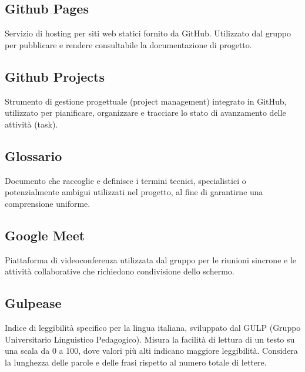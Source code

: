 \documentclass[a4paper, 11pt, oneside]{scrartcl} %
\begin{document}
\subsection*{Github Pages}


Servizio di hosting per siti web statici fornito da GitHub. Utilizzato dal gruppo per pubblicare e rendere consultabile la documentazione di progetto.

\vspace{0.5cm}

\subsection*{Github Projects}


Strumento di gestione progettuale (project management) integrato in GitHub, utilizzato per pianificare, organizzare e tracciare lo stato di avanzamento delle attività (task).

\vspace{0.5cm}

\subsection*{Glossario}


Documento che raccoglie e definisce i termini tecnici, specialistici o potenzialmente ambigui utilizzati nel progetto, al fine di garantirne una comprensione uniforme.

\vspace{0.5cm}

\subsection*{Google Meet}


Piattaforma di videoconferenza utilizzata dal gruppo per le riunioni sincrone e le attività collaborative che richiedono condivisione dello schermo.

\vspace{0.5cm}

\subsection*{Gulpease}
Indice di leggibilità specifico per la lingua italiana, sviluppato dal GULP (Gruppo Universitario Linguistico Pedagogico). Misura la facilità di lettura di un testo su una scala da 0 a 100, dove valori più alti indicano maggiore leggibilità. Considera la lunghezza delle parole e delle frasi rispetto al numero totale di lettere.
\vspace{0.5cm}
\end{document}
